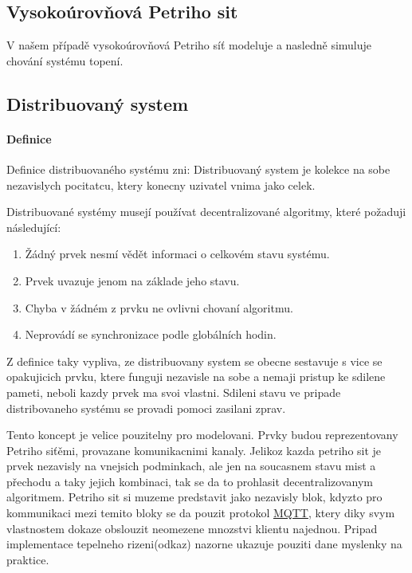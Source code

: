 \subsection{Vysokoúrovňová Petriho sit}

V našem případě vysokoúrovňová Petriho síť modeluje a nasledně simuluje chování systému topení.

\subsection{Distribuovaný system}
\label{subsec:distr_system}

\paragraph{Definice}

Definice distribuovaného systému zni:
Distribuovaný system je kolekce na sobe nezavislych pocitatcu, ktery konecny uzivatel vnima jako celek.

Distribuované systémy musejí používat decentralizované algoritmy, které požaduji následující:
\begin{enumerate}
  \item Žádný prvek nesmí vědět informaci o celkovém stavu systému.
  \item Prvek uvazuje jenom na základe jeho stavu.
  \item Chyba v žádném z prvku ne ovlivni chovaní algoritmu.
  \item Neprovádí se synchronizace podle globálních hodin.
\end{enumerate}

Z definice taky vypliva, ze distribuovany system se obecne sestavuje s vice se opakujicich prvku, ktere funguji nezavisle na sobe a nemaji pristup ke sdilene pameti, neboli kazdy prvek ma svoi vlastni. Sdileni stavu ve pripade distribovaneho systému se provadi pomoci zasilani zprav.

Tento koncept je velice pouzitelny pro modelovani. Prvky budou reprezentovany Petriho siťěmi, provazane komunikacnimi kanaly. Jelikoz kazda petriho sit je prvek nezavisly na vnejsich podminkach, ale jen na soucasnem stavu mist a přechodu a taky jejich kombinaci, tak se da to prohlasit decentralizovanym algoritmem. Petriho sit si muzeme predstavit jako nezavisly blok, kdyzto pro kommunikaci mezi temito bloky se da pouzit protokol \href{http://docs.oasis-open.org/mqtt/mqtt/v3.1.1/csprd02/mqtt-v3.1.1-csprd02.html}{MQTT}, ktery diky svym vlastnostem dokaze obslouzit neomezene mnozstvi klientu najednou. Pripad implementace tepelneho rizeni(odkaz) nazorne ukazuje pouziti dane myslenky na praktice.
